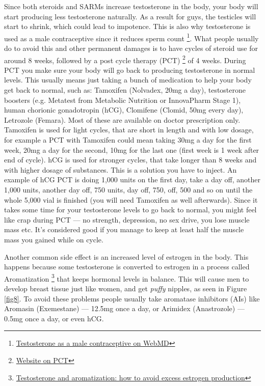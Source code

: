 \documentclass[openany, 12pt]{book}
\begin{document}
        Since both steroids and SARMs increase testosterone in the body, your body will start producing less testosterone naturally. As a result for guys, the testicles will start to shrink, which could
        lead to impotence. This is also why testosterone is used as a male contraceptive since it reduces sperm count
        \footnote{\href{https://www.webmd.com/sex/birth-control/news/20090506/testosterone-tested-as-male-contraceptive}{Testosterone as a male contraceptive on WebMD}}.
        What people usually do to avoid this and other permanent damages is to have cycles of steroid use for around 8 weeks, followed by a post cycle therapy (PCT)
        \footnote{\href{https://musclerage.co.uk/supplements-blog/pct-a-comprehensive-guide-to-post-cycle-therapy-2020/}
        {Website on PCT}}
        of 4 weeks. During PCT you make sure your body will go back to producing testosterone in normal levels. This usually means just taking a bunch of medication to help your body get back
        to normal, such as: Tamoxifen (Nolvadex, 20mg a day), testosterone boosters (e.g. Metatest from Metabolic Nutrition or InnovaPharm Stage 1), human chorionic gonadotropin (hCG),
        Clomifene (Clomid, 50mg every day), Letrozole (Femara). Most of these are available on doctor prescription only. Tamoxifen is used for light cycles, that are short in length and with low
        dosage, for example a PCT with Tamoxifen could mean taking 30mg a day for the first week, 20mg a day for the second, 10mg for the last one (first week is 1 week after end of cycle).
        hCG is used for stronger cycles, that take longer than 8 weeks and with higher dosage of substances. This is a solution you have to inject. An example of hCG PCT is doing 1,000 units
        on the first day, take a day off, another 1,000 units, another day off, 750 units, day off, 750, off, 500 and so on until the whole 5,000 vial is finished (you will need
        Tamoxifen as well afterwards).
        Since it takes some time for your testosterone levels to go back to normal, you might feel like crap during PCT --- no strength, depression,
        no sex drive, you lose muscle mass etc. It's considered good if you manage to keep at least half the muscle mass you gained while on cycle.
        
        Another common side effect is an increased level of estrogen in the body. This happens because some testosterone is converted to estrogen in a process called Aromatization
        \footnote{\href{https://www.blaineywellness.com/wp-content/uploads/2016/08/testosterone-and-aromatization-how-to-avoid-excess-estrogrogen-production.pdf}
        {Testosterone and aromatization: how to avoid excess estrogen production}} that keeps hormonal levels in balance. This will cause men to develop breast tissue just like women, and get 
        \textit{puffy} nipples, as seen in Figure \ref{fig8}. To avoid these problems people usually take aromatase inhibitors (AIs) like Aromasin (Exemestane) --- 12.5mg once a day, or
        Arimidex (Anastrozole) --- 0.5mg once a day, or even hCG.
\end{document}
